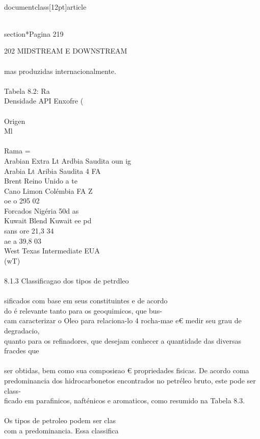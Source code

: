 \\documentclass[12pt]{article}
\begin{document}
\\section*{Pagina 219}

202 MIDSTREAM E DOWNSTREAM\\
\\
mas produzidas internacionalmente.\\
\\
Tabela 8.2: Ra\\
Densidade API Enxofre (\\%
\\
Origen\\
Ml\\
\\
Rama =\\
Arabian Extra Lt Ardbia Saudita oun ig\\
Arabia Lt Aribia Saudita 4 FA\\
Brent Reino Unido a te\\
Cano Limon Colémbia FA Z\\
oe o 295 02\\
Forcados Nigéria 50d as\\
Kuwait Blend Kuwait ee pd\\
sans ore 21,3 34\\
ae a 39,8 03\\
West Texas Intermediate EUA\\
(wT)\\
\\
8.1.3 Classificagao dos tipos de petrdleo\\
\\
sificados com base em seus constituintes e de acordo\\
do é relevante tanto para os geoquimicos, que bus-\\
cam caracterizar o Oleo para relaciona-lo 4 rocha-mae e€ medir seu grau de degradacio,\\
quanto para os refinadores, que desejam conhecer a quantidade das diversas fracdes que\\
\\
ser obtidas, bem como sua composi¢ao € propriedades fisicas. De acordo coma\\
predominancia dos hidrocarbonetos encontrados no petréleo bruto, este pode ser class-\\
ficado em parafinicos, nafténicos e aromaticos, como resumido na Tabela 8.3.\\
\\
Os tipos de petroleo podem ser clas\\
com a predominancia. Essa classifica\\
\end{document}
